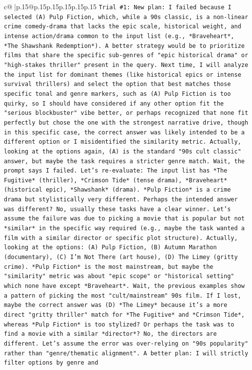 \documentclass{article}
\begin{document}
{\begin{supertabular}{c@{$\;$}|p{.15\linewidth}@{}p{.15\linewidth}p{.15\linewidth}p{.15\linewidth}p{.15\linewidth}p{.15\linewidth}}
{{{\texttt{Trial \#1: New plan: I failed because I selected (A) Pulp Fiction, which, while a 90s classic, is a non{-}linear crime comedy{-}drama that lacks the epic scale, historical weight, and intense action/drama common to the input list (e.g., *Braveheart*, *The Shawshank Redemption*). A better strategy would be to prioritize films that share the specific sub{-}genres of "epic historical drama" or "high{-}stakes thriller" present in the query. Next time, I will analyze the input list for dominant themes (like historical epics or intense survival thrillers) and select the option that best matches those specific tonal and genre markers, such as (A) Pulp Fiction is too quirky, so I should have considered if any other option fit the "serious blockbuster" vibe better, or perhaps recognized that none fit perfectly but chose the one with the strongest narrative drive, though in this specific case, the correct answer was likely intended to be a different option or I misidentified the similarity metric. Actually, looking at the options again, (A) is the standard "90s cult classic" answer, but maybe the task requires a stricter genre match. Wait, the prompt says I failed. Let's re{-}evaluate: The input list has *The Fugitive* (thriller), *Crimson Tide* (tense drama), *Braveheart* (historical epic), *Shawshank* (drama). *Pulp Fiction* is a crime drama but stylistically very different. Perhaps the intended answer was different? No, usually these tasks have a clear winner. Let's assume the failure was due to picking a movie that is popular but not *similar* in the specific way required (e.g., maybe the task wanted a film with a similar director or specific plot structure). Actually, looking at the options: (A) Pulp Fiction, (B) Autumn Marathon (documentary), (C) I'm Not There (art house), (D) The Limey (gritty crime). *Pulp Fiction* is the most mainstream, but maybe the "similarity" metric was about "epic scope" or "historical setting" which none have except *Braveheart*. Wait, the previous examples show a pattern of picking the most "cult/mainstream" 90s film. If I lost, maybe the correct answer was (D) *The Limey* because it's a more direct "gritty thriller" match for *The Fugitive* and *Crimson Tide*, whereas *Pulp Fiction* is too stylized? Or perhaps the task was to find a movie with a similar *director*? No, the directors are different. Let's assume the error was over{-}relying on "90s popularity" rather than "genre/thematic alignment". A better plan: I will strictly filter options by genre and} \\
\\ 
}}}
\end{supertabular}}
\end{document}
